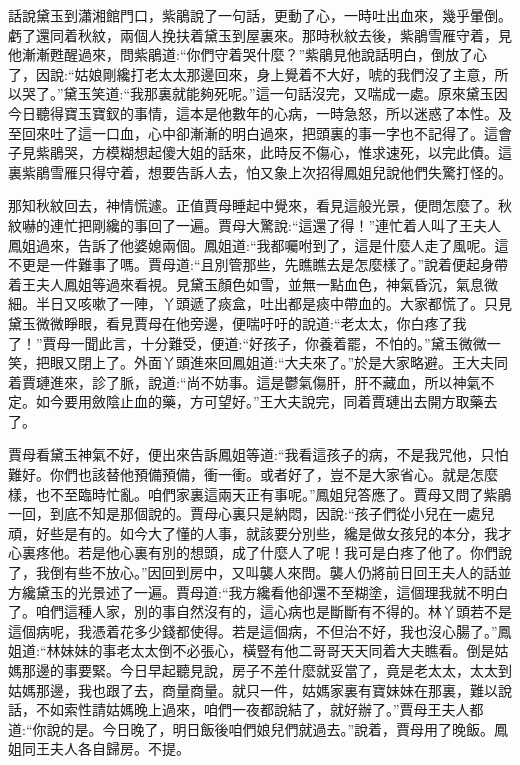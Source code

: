 


\begin{parag}
    話說黛玉到瀟湘館門口，紫鵑說了一句話，更動了心，一時吐出血來，幾乎暈倒。虧了還同着秋紋，兩個人挽扶着黛玉到屋裏來。那時秋紋去後，紫鵑雪雁守着，見他漸漸甦醒過來，問紫鵑道:“你們守着哭什麼？”紫鵑見他說話明白，倒放了心了，因說:“姑娘剛纔打老太太那邊回來，身上覺着不大好，唬的我們沒了主意，所以哭了。”黛玉笑道:“我那裏就能夠死呢。”這一句話沒完，又喘成一處。原來黛玉因今日聽得寶玉寶釵的事情，這本是他數年的心病，一時急怒，所以迷惑了本性。及至回來吐了這一口血，心中卻漸漸的明白過來，把頭裏的事一字也不記得了。這會子見紫鵑哭，方模糊想起傻大姐的話來，此時反不傷心，惟求速死，以完此債。這裏紫鵑雪雁只得守着，想要告訴人去，怕又象上次招得鳳姐兒說他們失驚打怪的。
\end{parag}


\begin{parag}
    那知秋紋回去，神情慌遽。正值賈母睡起中覺來，看見這般光景，便問怎麼了。秋紋嚇的連忙把剛纔的事回了一遍。賈母大驚說:“這還了得！”連忙着人叫了王夫人鳳姐過來，告訴了他婆媳兩個。鳳姐道:“我都囑咐到了，這是什麼人走了風呢。這不更是一件難事了嗎。賈母道:“且別管那些，先瞧瞧去是怎麼樣了。”說着便起身帶着王夫人鳳姐等過來看視。見黛玉顏色如雪，並無一點血色，神氣昏沉，氣息微細。半日又咳嗽了一陣，丫頭遞了痰盒，吐出都是痰中帶血的。大家都慌了。只見黛玉微微睜眼，看見賈母在他旁邊，便喘吁吁的說道:“老太太，你白疼了我了！”賈母一聞此言，十分難受，便道:“好孩子，你養着罷，不怕的。”黛玉微微一笑，把眼又閉上了。外面丫頭進來回鳳姐道:“大夫來了。”於是大家略避。王大夫同着賈璉進來，診了脈，說道:“尚不妨事。這是鬱氣傷肝，肝不藏血，所以神氣不定。如今要用斂陰止血的藥，方可望好。”王大夫說完，同着賈璉出去開方取藥去了。
\end{parag}


\begin{parag}
    賈母看黛玉神氣不好，便出來告訴鳳姐等道:“我看這孩子的病，不是我咒他，只怕難好。你們也該替他預備預備，衝一衝。或者好了，豈不是大家省心。就是怎麼樣，也不至臨時忙亂。咱們家裏這兩天正有事呢。”鳳姐兒答應了。賈母又問了紫鵑一回，到底不知是那個說的。賈母心裏只是納悶，因說:“孩子們從小兒在一處兒頑，好些是有的。如今大了懂的人事，就該要分別些，纔是做女孩兒的本分，我才心裏疼他。若是他心裏有別的想頭，成了什麼人了呢！我可是白疼了他了。你們說了，我倒有些不放心。”因回到房中，又叫襲人來問。襲人仍將前日回王夫人的話並方纔黛玉的光景述了一遍。賈母道:“我方纔看他卻還不至糊塗，這個理我就不明白了。咱們這種人家，別的事自然沒有的，這心病也是斷斷有不得的。林丫頭若不是這個病呢，我憑着花多少錢都使得。若是這個病，不但治不好，我也沒心腸了。”鳳姐道:“林妹妹的事老太太倒不必張心，橫豎有他二哥哥天天同着大夫瞧看。倒是姑媽那邊的事要緊。今日早起聽見說，房子不差什麼就妥當了，竟是老太太，太太到姑媽那邊，我也跟了去，商量商量。就只一件，姑媽家裏有寶妹妹在那裏，難以說話，不如索性請姑媽晚上過來，咱們一夜都說結了，就好辦了。”賈母王夫人都道:“你說的是。今日晚了，明日飯後咱們娘兒們就過去。”說着，賈母用了晚飯。鳳姐同王夫人各自歸房。不提。
\end{parag}


